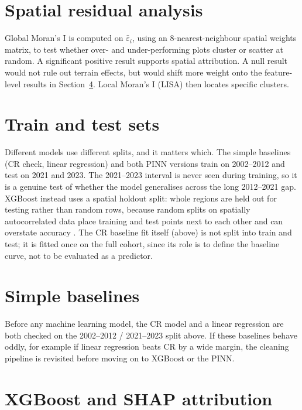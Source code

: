 \section{Spatial residual analysis}

Global Moran's I \citep{moran1950NotesContinuousStochastic} is computed on $\bar{\varepsilon}_i$, using an 8-nearest-neighbour spatial weights matrix, to test whether over- and under-performing plots cluster or scatter at random. A significant positive result supports spatial attribution. A null result would not rule out terrain effects, but would shift more weight onto the feature-level results in Section~\ref{sec:methodology-xgb}. Local Moran's I (LISA) \citep{anselin1995LocalIndicatorsSpatial} then locates specific clusters.

\section{Train and test sets}
\label{sec:train-test}

Different models use different splits, and it matters which. The simple baselines (CR check, linear regression) and both PINN versions train on 2002--2012 and test on 2021 and 2023. The 2021--2023 interval is never seen during training, so it is a genuine test of whether the model generalises across the long 2012--2021 gap. XGBoost instead uses a spatial holdout split: whole regions are held out for testing rather than random rows, because random splits on spatially autocorrelated data place training and test points next to each other and can overstate accuracy \citep{roberts2017CrossvalidationStrategiesData}. The CR baseline fit itself (above) is not split into train and test; it is fitted once on the full cohort, since its role is to define the baseline curve, not to be evaluated as a predictor.

\section{Simple baselines}

Before any machine learning model, the CR model and a linear regression are both checked on the 2002--2012 / 2021--2023 split above. If these baselines behave oddly, for example if linear regression beats CR by a wide margin, the cleaning pipeline is revisited before moving on to XGBoost or the PINN.

\section{XGBoost and SHAP attribution}
\label{sec:methodology-xgb}

